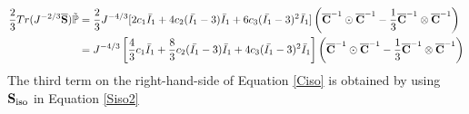 \begin{equation} \label{part22}
\begin{split}
\frac{2}{3}Tr(J^{-2/3}\overline{\bold{S}}) \tilde{\mathbb{P}}
= {} & 
\frac{2}{3}J^{-4/3} [2c_1\bar{I}_1 + 4c_2(\bar{I_1} - 3)\bar{I}_1 + 6c_3(\bar{I_1} - 3)^2\bar{I}_1] \left({\overline{\bold{C}}}^{-1} \odot {\overline{\bold{C}}}^{-1} - \frac{1}{3}{\overline{\bold{C}}}^{-1} \otimes {\overline{\bold{C}}}^{-1} \right) \\
= {} &
J^{-4/3} \left[\frac{4}{3}c_1\bar{I}_1 + \frac{8}{3}c_2(\bar{I_1} - 3)\bar{I}_1 + 4c_3(\bar{I_1} - 3)^2\bar{I}_1\right] \left({\overline{\bold{C}}}^{-1} \odot {\overline{\bold{C}}}^{-1} - \frac{1}{3}{\overline{\bold{C}}}^{-1} \otimes {\overline{\bold{C}}}^{-1} \right) 
\end{split}
\end{equation}
The third term on the right-hand-side of Equation \ref{Ciso} is obtained by using $\bold{S}_\mathrm{iso}$ in Equation \ref{Siso2}

